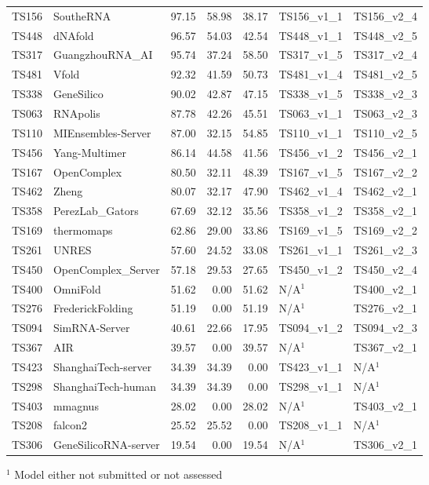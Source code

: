 \begin{table}[ht]
{\begin{tabular}{llrrrll}
TS156 & SoutheRNA & 97.15 & 58.98 & 38.17 & TS156\_v1\_1 & TS156\_v2\_4 \\ 
TS448 & dNAfold & 96.57 & 54.03 & 42.54 & TS448\_v1\_1 & TS448\_v2\_5 \\ 
TS317 & GuangzhouRNA\_AI & 95.74 & 37.24 & 58.50 & TS317\_v1\_5 & TS317\_v2\_4 \\ 
TS481 & Vfold & 92.32 & 41.59 & 50.73 & TS481\_v1\_4 & TS481\_v2\_5 \\ 
TS338 & GeneSilico & 90.02 & 42.87 & 47.15 & TS338\_v1\_5 & TS338\_v2\_3 \\ 
TS063 & RNApolis & 87.78 & 42.26 & 45.51 & TS063\_v1\_1 & TS063\_v2\_3 \\ 
TS110 & MIEnsembles-Server & 87.00 & 32.15 & 54.85 & TS110\_v1\_1 & TS110\_v2\_5 \\ 
TS456 & Yang-Multimer & 86.14 & 44.58 & 41.56 & TS456\_v1\_2 & TS456\_v2\_1 \\ 
TS167 & OpenComplex & 80.50 & 32.11 & 48.39 & TS167\_v1\_5 & TS167\_v2\_2 \\ 
TS462 & Zheng & 80.07 & 32.17 & 47.90 & TS462\_v1\_4 & TS462\_v2\_1 \\ 
TS358 & PerezLab\_Gators & 67.69 & 32.12 & 35.56 & TS358\_v1\_2 & TS358\_v2\_1 \\ 
TS169 & thermomaps & 62.86 & 29.00 & 33.86 & TS169\_v1\_5 & TS169\_v2\_2 \\ 
TS261 & UNRES & 57.60 & 24.52 & 33.08 & TS261\_v1\_1 & TS261\_v2\_3 \\ 
TS450 & OpenComplex\_Server & 57.18 & 29.53 & 27.65 & TS450\_v1\_2 & TS450\_v2\_4 \\ 
TS400 & OmniFold & 51.62 & 0.00 & 51.62 & N/A$^{1}$ & TS400\_v2\_1 \\ 
TS276 & FrederickFolding & 51.19 & 0.00 & 51.19 & N/A$^{1}$ & TS276\_v2\_1 \\ 
TS094 & SimRNA-Server & 40.61 & 22.66 & 17.95 & TS094\_v1\_2 & TS094\_v2\_3 \\ 
TS367 & AIR & 39.57 & 0.00 & 39.57 & N/A$^{1}$ & TS367\_v2\_1 \\ 
TS423 & ShanghaiTech-server & 34.39 & 34.39 & 0.00 & TS423\_v1\_1 & N/A$^{1}$ \\ 
TS298 & ShanghaiTech-human & 34.39 & 34.39 & 0.00 & TS298\_v1\_1 & N/A$^{1}$ \\ 
TS403 & mmagnus & 28.02 & 0.00 & 28.02 & N/A$^{1}$ & TS403\_v2\_1 \\ 
TS208 & falcon2 & 25.52 & 25.52 & 0.00 & TS208\_v1\_1 & N/A$^{1}$ \\ 
TS306 & GeneSilicoRNA-server & 19.54 & 0.00 & 19.54 & N/A$^{1}$ & TS306\_v2\_1 \\ 
\bottomrule
\end{tabular}%
}
\begin{flushleft}\footnotesize $^{1}$ Model either not submitted or not assessed\end{flushleft}
\end{table}
